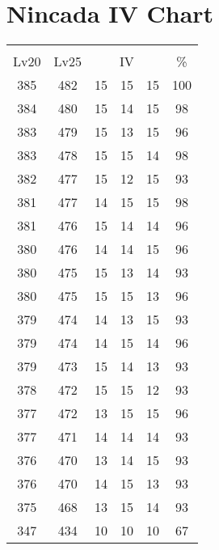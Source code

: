 \documentclass{article}%
\begin{document}
%
\normalsize%
\section{Nincada IV Chart}%
\label{sec:Nincada IV Chart}%
\renewcommand{\arraystretch}{1.5}%
\begin{tabular}{|c|c|c|c|c|c|}%
\hline%
\multicolumn{6}{|c|}{\textcolor{white}{ 
\linebreak{Nincada}
}%
\cellcolor{black}}\\%
\multicolumn{1}{|c}{Lv20}&\multicolumn{1}{c|}{Lv25}&\multicolumn{3}{c|}{IV}&\multicolumn{1}{|c|}{\%}\\%
\hline%
\rowcolor{color100}%
385&482&15&15&15&100\\%
\hline%
\rowcolor{color98}%
384&480&15&14&15&98\\%
\hline%
\rowcolor{color96}%
383&479&15&13&15&96\\%
\hline%
\rowcolor{color98}%
383&478&15&15&14&98\\%
\hline%
\rowcolor{color93}%
382&477&15&12&15&93\\%
\hline%
\rowcolor{color98}%
381&477&14&15&15&98\\%
\hline%
\rowcolor{color96}%
381&476&15&14&14&96\\%
\hline%
\rowcolor{color96}%
380&476&14&14&15&96\\%
\hline%
\rowcolor{color93}%
380&475&15&13&14&93\\%
\hline%
\rowcolor{color96}%
380&475&15&15&13&96\\%
\hline%
\rowcolor{color93}%
379&474&14&13&15&93\\%
\hline%
\rowcolor{color96}%
379&474&14&15&14&96\\%
\hline%
\rowcolor{color93}%
379&473&15&14&13&93\\%
\hline%
\rowcolor{color93}%
378&472&15&15&12&93\\%
\hline%
\rowcolor{color96}%
377&472&13&15&15&96\\%
\hline%
\rowcolor{color93}%
377&471&14&14&14&93\\%
\hline%
\rowcolor{color93}%
376&470&13&14&15&93\\%
\hline%
\rowcolor{color93}%
376&470&14&15&13&93\\%
\hline%
\rowcolor{color93}%
375&468&13&15&14&93\\%
\hline%
\rowcolor{color91}%
347&434&10&10&10&67\\%
\end{tabular}

%
\end{document}

